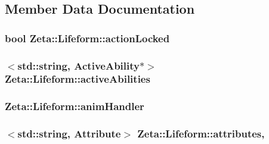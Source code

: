 \subsection{Member Data Documentation}
\hypertarget{classZeta_1_1Lifeform_a6242d7fb4501f142e093968344764715}{
\subsubsection[{action\+Locked}]{\setlength{\rightskip}{0pt plus 5cm}bool Zeta\+::\+Lifeform\+::action\+Locked\hspace{0.3cm}{\ttfamily [protected]}}}\label{classZeta_1_1Lifeform_a6242d7fb4501f142e093968344764715}
\hypertarget{classZeta_1_1Lifeform_aa0877b745f61e351278ce84ac7411084}{
\subsubsection[{active\+Abilities}]{$<$std\+::string, {\bf Active\+Ability}$\ast$$>$ Zeta\+::\+Lifeform\+::active\+Abilities\hspace{0.3cm}{\ttfamily [protected]}}}\label{classZeta_1_1Lifeform_aa0877b745f61e351278ce84ac7411084}
\hypertarget{classZeta_1_1Lifeform_a4ff129ee1b26d50bb69a96e2eea07d49}{
\subsubsection[{anim\+Handler}]{ Zeta\+::\+Lifeform\+::anim\+Handler\hspace{0.3cm}{\ttfamily [protected]}}}\label{classZeta_1_1Lifeform_a4ff129ee1b26d50bb69a96e2eea07d49}
\hypertarget{classZeta_1_1Lifeform_a0bac715f4ec7912886826a9147c22a72}{
\subsubsection[{attributes}]{$<$std\+::string, {\bf Attribute}$>$ Zeta\+::\+Lifeform\+::attributes\hspace{0.3cm}{\ttfamily [mutable]}, {\ttfamily [protected]}}}\label{classZeta_1_1Lifeform_a0bac715f4ec7912886826a9147c22a72}
